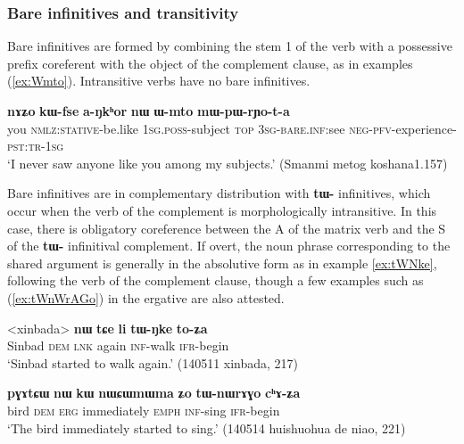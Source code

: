 \documentclass[oneside,a4paper,11pt]{article}
\newcommand{\ipa}[1]{\textbf{\phon#1}} %
\begin{document}
\subsubsection{Bare infinitives and transitivity}
Bare infinitives are formed by combining the stem 1 of the verb with a possessive prefix coreferent with the object of the complement clause, as in examples (\ref{ex:Wmto}). Intransitive verbs have no bare infinitives.

\begin{exe}
\ex \label{ex:Wmto}
\gll \ipa{nɤʑo} 	\ipa{kɯ-fse} 	\ipa{a-ŋkʰor} 	\ipa{nɯ} 	\ipa{ɯ-mto} 	\ipa{mɯ-pɯ-rɲo-t-a} \\
you \textsc{nmlz:stative}-be.like \textsc{1sg.poss}-subject \textsc{top} \textsc{3sg}-\textsc{bare.inf:}see \textsc{neg-pfv}-experience-\textsc{pst:tr-1sg} \\
\glt  `I never saw anyone like you among my subjects.' (Smanmi metog koshana1.157)
\end{exe} 

Bare infinitives are in complementary distribution with \ipa{tɯ-} infinitives,  which occur when the verb of the complement is morphologically intransitive. In this case, there is obligatory coreference between the A of the matrix verb and the S of the \ipa{tɯ-} infinitival complement. If overt, the noun phrase corresponding to the shared argument is generally in the absolutive form as in example \ref{ex:tWNke}, following the verb of the complement clause, though a few examples such as (\ref{ex:tWnWrAGo}) in the ergative are also attested.

\begin{exe}
\ex \label{ex:tWNke}
\gll
<xinbada> 	\ipa{nɯ} 	\ipa{tɕe} 	\ipa{li} 	\ipa{tɯ-ŋke} 	\ipa{to-ʑa} \\
Sinbad \textsc{dem} \textsc{lnk} again  \textsc{inf}-walk \textsc{ifr}-begin \\
\glt `Sinbad started to walk again.' (140511 xinbada, 217)
\end{exe}


\begin{exe}
\ex \label{ex:tWnWrAGo}
\gll \ipa{pɣɤtɕɯ} 	\ipa{nɯ} 	\ipa{kɯ} 	\ipa{nɯɕɯmɯma} 	\ipa{ʑo} 	\ipa{tɯ-nɯrɤɣo} 	\ipa{cʰɤ-ʑa} \\
bird \textsc{dem} \textsc{erg} immediately \textsc{emph} \textsc{inf}-sing \textsc{ifr}-begin \\
\glt `The bird immediately started to sing.' (140514 huishuohua de niao, 221)
\end{exe}
\end{document}

